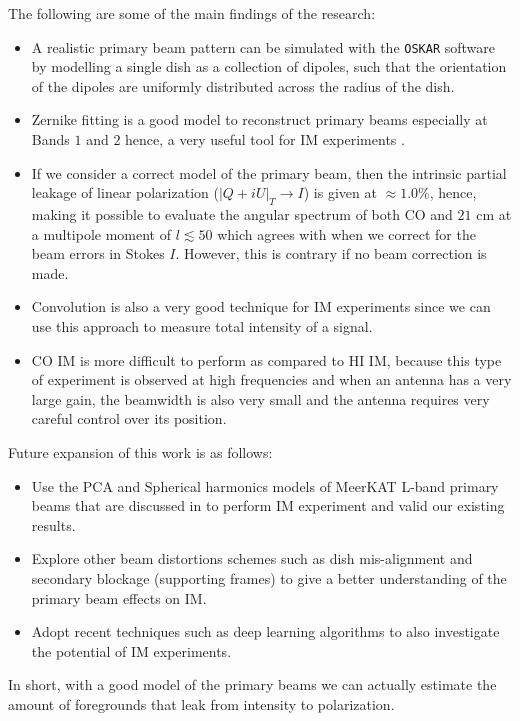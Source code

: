 \noindent The following are some of the main findings of the research:
\begin{itemize}
\item A realistic primary beam pattern can be simulated with the {\tt OSKAR} software by modelling a single dish as a collection of dipoles, such that the orientation 
of the dipoles are uniformly distributed across the radius of the dish.
\item Zernike fitting is a good model to reconstruct primary beams especially at Bands $1$ and $2$ hence, a very useful tool for IM experiments . 
\item If we consider a correct model of the primary beam, then the intrinsic partial leakage of linear polarization ($|Q + iU|_{T} \longrightarrow I$) is given at $\approx 1.0 \%$, 
hence, making it possible to evaluate the angular spectrum of both CO and $21$ cm  at a multipole moment of $l \lesssim 50$  which agrees with when we correct for
the beam errors in Stokes $I$. However, this is contrary if no beam correction is made.
\item Convolution is also a very good technique for IM experiments since we can use this approach to measure total intensity of a signal. 
\item CO IM is more difficult to perform as compared to HI IM, because this type of experiment is observed at high frequencies and when an antenna has a very large gain,
the beamwidth is also very small and the antenna requires very careful control over its position.
\end{itemize}

\noindent Future expansion of this work is as follows:
\begin{itemize}
 \item Use the PCA and Spherical harmonics models of MeerKAT L-band primary beams that are discussed in \citep{asad2018} to perform IM experiment and valid our existing results.
 
 \item Explore other beam distortions schemes such as dish mis-alignment and secondary blockage (supporting frames) to give a better understanding of the primary beam effects on 
 IM.
 
 \item Adopt recent techniques such as deep learning algorithms to also investigate the potential of IM experiments.
\end{itemize}


\noindent  In short, with a good model of the primary beams we can actually estimate the amount of foregrounds that leak from intensity to polarization.

